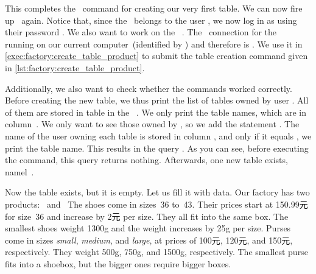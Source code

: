 %
%
%
%
%
This completes the \sql\ command for creating our very first table.
We can now fire up \psql\ again.
Notice that, since the \db\ belongs to the user , we now log in as  using their password .
We also want to work on the \db\ .
The \postgresql\ connection  for the \db\  running on our current computer~(identified by \localhost) and therefore is .
We use it in \cref{exec:factory:create_table_product} to submit the table creation command given in \cref{lst:factory:create_table_product}.%
%
\begin{sloppypar}%
Additionally, we also want to check whether the commands worked correctly.
Before creating the new table, we thus print the list of tables owned by user .
All of them are stored in table  in the \postgresql\ .
We only print the table names, which are in column~.
We only want to see those owned by , so we add the statement .
The name of the user owning each table is stored in column , and only if it equals , we print the table name.
This results in the query .
As you can see, before executing the  command, this query returns nothing.
Afterwards, one new table exists, namel~.%
\end{sloppypar}%
\FloatBarrier%
\endhsection%
%
\afterpage{\clearpage}%
%
%
Now the table  exists, but it is empty.
Let us fill it with data.
Our factory has two products:~ and~
The shoes come in sizes~36 to~43.
Their prices start at 150.99元 for size~36 and increase by 2元 per size.
They all fit into the same box.
The smallest shoes weight 1300g and the weight increases by 25g per size.
Purses come in sizes \emph{small}, \emph{medium}, and \emph{large}, at prices of 100元, 120元, and 150元, respectively.
They weight 500g, 750g, and 1500g, respectively.
The smallest purse fits into a shoebox, but the bigger ones require bigger boxes.

